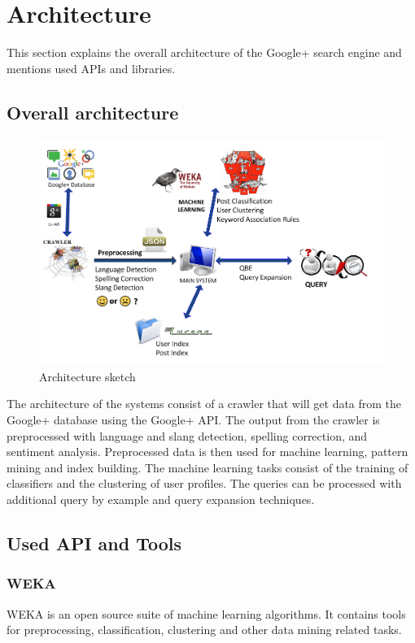 \section{Architecture}
This section explains the overall architecture of the Google+ search engine and mentions used APIs and libraries.
\subsection*{Overall architecture}
\begin{figure}[h]
\begin{center}
    \includegraphics[scale=0.4]{images/architecture.png}
	\caption{Architecture sketch\label{architecture_sketch}}
\end{center}
\end{figure}
The architecture of the systems consist of a crawler that will get data from the Google+ database using the Google+ API. The output from the crawler is preprocessed with language and slang detection, spelling correction, and sentiment analysis. Preprocessed data is then used for machine learning, pattern mining and index building. The machine learning tasks consist of the training of classifiers and the clustering of user profiles. The queries can be processed with additional query by example and query expansion techniques.
\subsection*{Used API and Tools}
\subsubsection*{WEKA}
WEKA is an open source suite of machine learning algorithms. It contains tools for preprocessing, classification, clustering and other data mining related tasks. 
